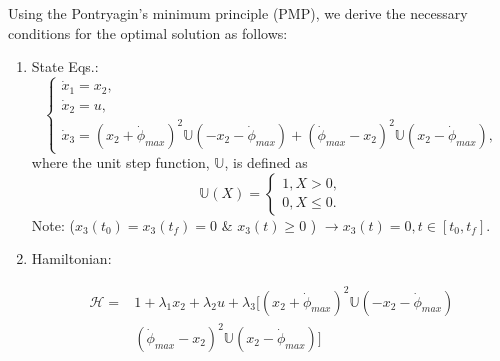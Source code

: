 \documentclass[letterpaper, preprint, paper,11pt]{AAS}	%
\begin{document}
	Using the Pontryagin's minimum principle (PMP), we derive the necessary conditions for the optimal solution as follows:
	\begin{enumerate}
		\item State Eqs.:
		\begin{equation}
		\left\{
		\begin{array}{l}
		\dot{x}_1=x_2, \\
		\dot{x}_2=u, \\
		\dot{x}_3=(x_2+\dot{\phi}_{max})^2\mathbb{U}(-x_2-\dot{\phi}_{max})+(\dot{\phi}_{max}-x_2)^2\mathbb{U}(x_2-\dot{\phi}_{max}),
		\end{array}
		\right.
		\end{equation}
		where the unit step function, $\mathbb{U}$, is defined as
		\begin{equation}
		\mathbb{U}(X)=\left\{
		\begin{array}{l}
		1,   X>0, \\
		0,   X\leq 0.
		\end{array}
		\right.
		\end{equation}
		Note:  ($x_3(t_0)=x_3(t_f)=0$ \& $x_3(t)\geq 0$ ) $\rightarrow x_3(t)=0, t\in[t_0, t_f]$. 
		
		\item Hamiltonian:
		
		\begin{equation}
		\begin{split}
		\mathscr{H}=& 1+\lambda_1x_2+\lambda_2u+\lambda_3\Big[(x_2+\dot{\phi}_{max})^2\mathbb{U}(-x_2-\dot{\phi}_{max})\\
		& (\dot{\phi}_{max}-x_2)^2\mathbb{U}(x_2-\dot{\phi}_{max})\Big]
		\end{split}
		\end{equation}
		
		

\end{enumerate}
\end{document}
